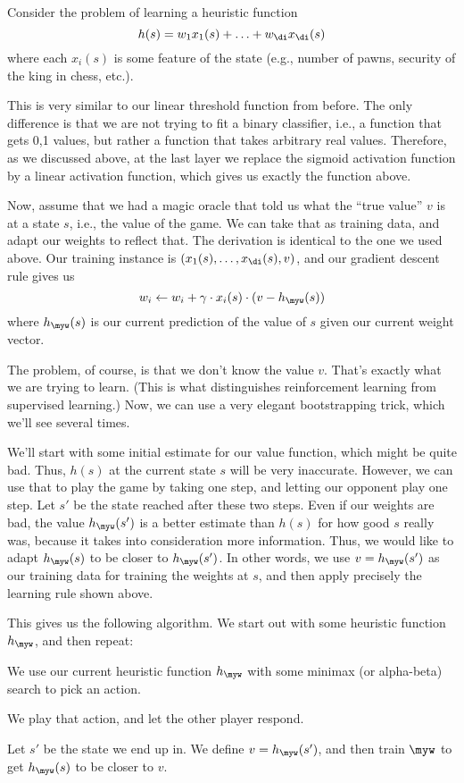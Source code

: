 Consider the problem of learning a heuristic function 
\[
  h(s) = w_1 x_1(s) + \ldots + w_{\di} x_{\di}(s)
\]
where each $x_i(s)$ is some feature of the state (e.g., number of pawns,
security of the king in chess, etc.).  

This is very similar to our linear threshold function from before.  The only
difference is that we are not trying to fit a binary classifier, i.e., a
function that gets 0,1 values, but rather a function that takes arbitrary
real values.  Therefore, as we discussed above, at the last layer we
replace the sigmoid activation function by a linear activation function,
which gives us exactly the function above.

Now, assume that we had a magic oracle that told us what the ``true value'' $v$
is at a state $s$, i.e., the value of the game.  We can take that as
training data, and adapt our weights to reflect that.  The derivation is
identical to the one we used above.  Our training instance is
$(x_1(s),\ldots,x_{\di}(s),v)$, and our gradient descent rule gives us
\[  
  w_i  \leftarrow w_i + \gamma \cdot x_i(s) \cdot (v - h_{\myw}(s))
\]
where $h_{\myw}(s)$ is our current prediction of the value of $s$ given our 
current weight vector.

The problem, of course, is that we don't know the value $v$.  That's exactly
what we are trying to learn.  (This is what distinguishes reinforcement
learning from supervised learning.)  Now, we can use a very elegant
bootstrapping trick, which we'll see several times. 

We'll start with some initial estimate for our value function, which might
be quite bad.  Thus, $h(s)$ at the current state $s$ will be very
inaccurate.  However, we can use that to play the game by taking one step,
and letting our opponent play one step.  Let $s'$ be the state reached after
these two steps.  Even if our weights are bad, the value $h_{\myw}(s')$ is a
better estimate than $h(s)$ for how good $s$ really was, because it takes
into consideration more information.  Thus, we would like to adapt
$h_{\myw}(s)$ to be closer to $h_{\myw}(s')$.  In other words, we use $v =
h_{\myw}(s')$ as our training data for training the weights at $s$, and then
apply precisely the learning rule shown above.

This gives us the following algorithm.  We start out with some heuristic
function $h_{\myw}$, and then repeat:
\bitem
\item
We use our current heuristic function $h_{\myw}$ with some minimax (or
alpha-beta) search to pick an action.
\item
We play that action, and let the other player respond.
\item
Let $s'$ be the state we end up in.  We define $v = h_{\myw}(s')$, and then
train $\myw$ to get $h_{\myw}(s)$ to be closer to $v$.
\eitem

